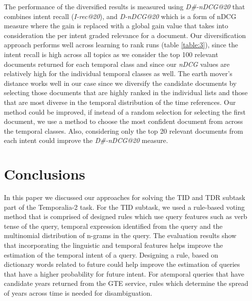 \documentclass{sig-alternate}
\begin{document}
The performance of the diversified results is measured using \textit{D\#-nDCG@20} that combines intent recall (\textit{I-rec@20}), and \textit{D-nDCG@20} which is a form of nDCG measure where the gain is replaced with a global gain value that takes into consideration the per intent graded relevance for a document. Our diversification approach performs well across learning to rank runs (table \ref{table:3}), since the intent recall is high across all topics as we consider the top 100 relevant documents returned for each temporal class and since our \textit{nDCG} values are relatively high for the individual temporal classes as well. The earth mover's distance works well in our case since we diversify the candidate documents by selecting those documents that are highly ranked in the individual lists and those that are most diverse in the temporal distribution of the time references. Our method could be improved, if instead of a random selection for selecting the first document, we use a method to choose the most confident document from across the temporal classes. Also, considering only the top 20 relevant documents from each intent could improve the \textit{D\#-nDCG@20} measure.
\section{Conclusions}\label{Conclusion}
In this paper we discussed our approaches for solving the TID and TDR subtask part of the Temporalia-2 task. For the TID subtask, we used a rule-based voting method that is comprised of designed rules which use query features such as verb tense of the query, temporal expression identified from the query and the multinomial distribution of n-grams in the query. The evaluation results show that incorporating the linguistic and temporal features helps improve the estimation of the temporal intent of a query. Designing a rule, based on dictionary words related to future could help improve the estimation of queries that have a higher probability for future intent. For atemporal queries that have candidate years returned from the GTE service, rules which determine the spread of years across time is needed for disambiguation.
\end{document}
